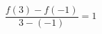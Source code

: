 \documentclass[preview]{standalone}
\begin{document}
\begin{align*}
\dfrac{f(3) - f(-1)}{3 - (-1)} = 1
\end{align*}
\end{document}

